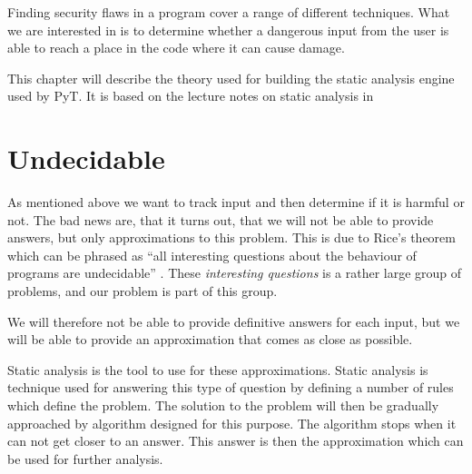 Finding security flaws in a program cover a range of different techniques.
What we are interested in is to determine whether a dangerous input from the user is able to reach a place in the code where it can cause damage.

This chapter will describe the theory used for building the static analysis engine used by PyT.
It is based on the lecture notes on static analysis in \citet{schwartzbach}


\section{Undecidable}\label{theory_intro}
As mentioned above we want to track input and then determine if it is harmful or not.
The bad news are, that it turns out, that we will not be able to provide answers, but only approximations to this problem.
This is due to Rice's theorem which can be phrased as ``all interesting questions about the behaviour of programs are undecidable'' \citep[p.~3]{schwartzbach}.
These \emph{interesting questions} is a rather large group of problems, and our problem is part of this group.

We will therefore not be able to provide definitive answers for each input, but we will be able to provide an approximation that comes as close as possible.

Static analysis is the tool to use for these approximations.
Static analysis is technique used for answering this type of question by defining a number of rules which define the problem.
The solution to the problem will then be gradually approached by algorithm designed for this purpose.
The algorithm stops when it can not get closer to an answer.
This answer is then the approximation which can be used for further analysis.

